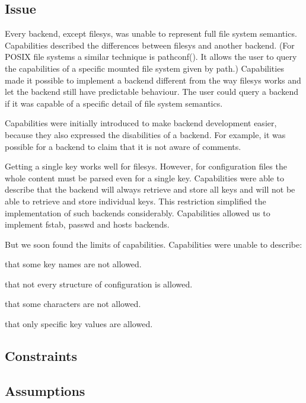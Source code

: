 \subsection*{Issue}

Every backend, except {\ttfamily filesys}, was unable to represent full file system semantics. Capabilities described the differences between {\ttfamily filesys} and another backend. (For P\+O\+S\+I\+X file systems a similar technique is {\ttfamily pathconf()}. It allows the user to query the capabilities of a specific mounted file system given by path.) Capabilities made it possible to implement a backend different from the way {\ttfamily filesys} works and let the backend still have predictable behaviour. The user could query a backend if it was capable of a specific detail of file system semantics.

Capabilities were initially introduced to make backend development easier, because they also expressed the disabilities of a backend. For example, it was possible for a backend to claim that it is not aware of comments.

Getting a single key works well for {\ttfamily filesys}. However, for configuration files the whole content must be parsed even for a single key. Capabilities were able to describe that the backend will always retrieve and store all keys and will not be able to retrieve and store individual keys. This restriction simplified the implementation of such backends considerably. Capabilities allowed us to implement fstab, passwd and hosts backends.

But we soon found the limits of capabilities. Capabilities were unable to describe\+:


\begin{DoxyItemize}
\item that some key names are not allowed.
\item that not every structure of configuration is allowed.
\item that some characters are not allowed.
\item that only specific key values are allowed.
\end{DoxyItemize}

\subsection*{Constraints}

\subsection*{Assumptions}

